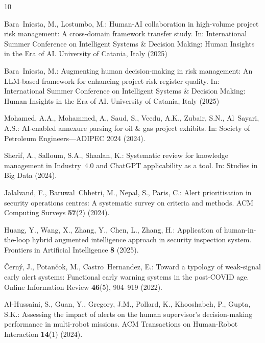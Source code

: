 \documentclass[runningheads]{llncs}
\begin{document}

\begin{thebibliography}{10}

Bara~Iniesta, M., Lostumbo, M.: Human-AI collaboration in high-volume project risk management: A cross-domain framework transfer study. In: International Summer Conference on Intelligent Systems \& Decision Making: Human Insights in the Era of AI. University of Catania, Italy (2025)

Bara~Iniesta, M.: Augmenting human decision-making in risk management: An {LLM}-based framework for enhancing project risk register quality. In: International Summer Conference on Intelligent Systems \& Decision Making: Human Insights in the Era of AI. University of Catania, Italy (2025)

Mohamed, A.A., Mohammed, A., Saud, S., Veedu, A.K., Zubair, S.N., Al~Sayari, A.S.: {AI}-enabled annexure parsing for oil \& gas project exhibits. In: Society of Petroleum Engineers---ADIPEC 2024 (2024). 

Sherif, A., Salloum, S.A., Shaalan, K.: Systematic review for knowledge management in Industry~4.0 and {ChatGPT} applicability as a tool. In: Studies in Big Data (2024). 

Jalalvand, F., Baruwal~Chhetri, M., Nepal, S., Paris, C.: Alert prioritisation in security operations centres: A systematic survey on criteria and methods. ACM Computing Surveys \textbf{57}(2) (2024). 

Huang, Y., Wang, X., Zhang, Y., Chen, L., Zhang, H.: Application of human-in-the-loop hybrid augmented intelligence approach in security inspection system. Frontiers in Artificial Intelligence \textbf{8} (2025). 

\v{C}ern\'{y}, J., Potan\v{c}ok, M., Castro~Hernandez, E.: Toward a typology of weak-signal early alert systems: Functional early warning systems in the post-{COVID} age. Online Information Review \textbf{46}(5), 904--919 (2022). 

Al-Hussaini, S., Guan, Y., Gregory, J.M., Pollard, K., Khooshabeh, P., Gupta, S.K.: Assessing the impact of alerts on the human supervisor's decision-making performance in multi-robot missions. ACM Transactions on Human-Robot Interaction \textbf{14}(1) (2024). 


\end{thebibliography}
\end{document}
